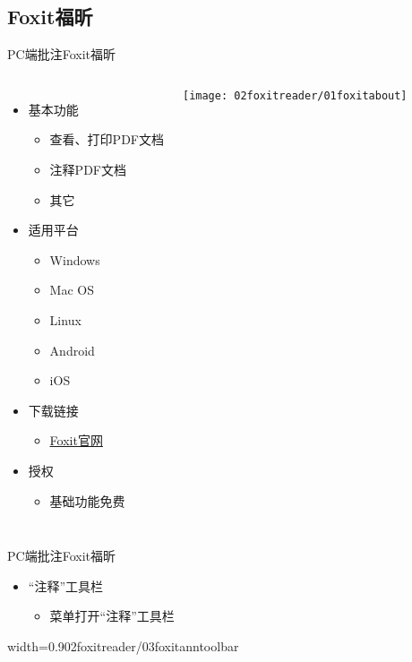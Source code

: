 \documentclass[fontset = none, t, aspectratio=169]{ctexbeamer}
\begin{document}
\subsection{Foxit福昕}
\begin{frame}{PC端批注}{Foxit福昕}
  \begin{columns}[c, onlytextwidth]
    \begin{itemize}
    \item 基本功能
      \begin{itemize}
      \item 查看、打印PDF文档
      \item \alert{注释}PDF文档
      \item 其它
      \end{itemize}
    \item 适用平台
      \begin{itemize}
      \item Windows
      \item Mac OS
      \item Linux
      \item Android
      \item iOS
      \end{itemize}
    \item 下载链接
      \begin{itemize}
        \item \href{https://www.foxitsoftware.cn/downloads/}{Foxit官网}
      \end{itemize}
    \item 授权
      \begin{itemize}
      \item 基础功能\alert{免费}
      \end{itemize}
    \end{itemize}
    \texttt{[image: 02foxitreader/01foxitabout]}
  \end{columns}
\end{frame}

\begin{frame}{PC端批注}{Foxit福昕}
  \begin{itemize}
  \item \enquote{注释}工具栏
    \begin{itemize}
    \item {}菜单打开\enquote{注释}工具栏
    \end{itemize}
  \end{itemize}
  \vspace{8ex}
  \begin{center}
    \begin{annotationimage}{width=0.9\textwidth}{02foxitreader/03foxitanntoolbar}
    \end{annotationimage}
  \end{center}
\end{frame}
\end{document}
